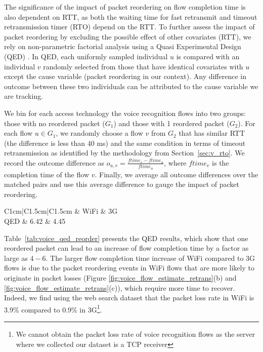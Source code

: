 The significance of the impact of packet reordering on flow completion time is also dependent on RTT, as both the waiting time for fast retransmit and timeout retransmission timer (\ie RTO) depend on the RTT. To further assess the impact of packet reordering by excluding the possible effect of other covariates (\eg RTT), we rely on non-parametric factorial analysis using a Quasi Experimental Design (QED) \cite{krishnan2013video}. In QED, each uniformly sampled individual $u$ is compared with an individual $v$ randomly selected from those that have identical covariates with $u$ except the cause variable (packet reordering in our context). Any difference in outcome between these two individuals can be attributed to the cause variable we are tracking.

We bin for each access technology the voice recognition flows into two groups: those with no reordered packet ($G_1$) and those with 1 reordered packet ($G_2$). For each flow $u \in G_1$, we randomly choose a flow $v$ from $G_2$ that has similar RTT (\ie the difference is less than 40 ms) and the same condition in terms of timeout retransmission as identified by the methodology from Section~\ref{sec:v_rto}. We record the outcome difference as $o_{u,v} = \frac{ftime_{v} - ftime_{u}}{ftime_{u}}$, where $ftime_v$ is the completion time of the flow $v$. Finally, we average all outcome differences over the matched pairs and use this average difference to gauge the impact of packet reordering.

\begin{table}[th]
\caption{QED results for the impact of packet reordering.}
\label{tab:voice_qed_reorder}
\centering
\renewcommand{\arraystretch}{1}
\begin{tabular}{C{1cm}|C{1.5cm}|C{1.5cm}}
	\hline
	 & WiFi & 3G \\
	\hline
	QED & 6.42 & 4.45 \\
	\hline
\end{tabular}
\end{table}

Table~\ref{tab:voice_qed_reorder} presents the QED results, which show that one reordered packet can lead to an increase of flow completion time by a factor as large as $4-6$. The larger flow completion time increase of WiFi compared to 3G flows is due to the packet reordering events in WiFi flows that are more likely to originate in packet losses (\ie Figure \ref{fig:voice_flow_estimate_retrans}(b) and \ref{fig:voice_flow_estimate_retrans}(c)), which require more time to recover. Indeed, we find using the web search dataset that the packet loss rate in WiFi is 3.9\% compared to 0.9\% in 3G\footnote{We cannot obtain the packet loss rate of voice recognition flows as the server where we collected our dataset is a TCP receiver}. 

